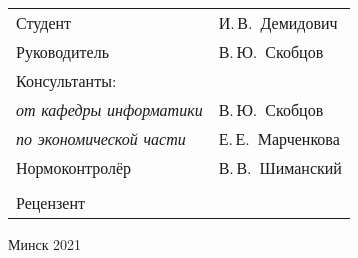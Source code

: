 \begin{titlepage}
\begin{center}
    \begin{tabular}{ p{}p{} }
      Студент & И.\,В.~Демидович \\
      Руководитель & В.\,Ю.~Скобцов \\
      Консультанты: &\\
      \hspace*{3ex}\emph{от кафедры информатики} & В.\,Ю.~Скобцов \\
      \hspace*{3ex}\emph{по экономической части} & Е.\,Е.~Марченкова \\
      Нормоконтролёр & В.\,В.~Шиманский\\
      & \\
      Рецензент &
    \end{tabular}
    
    \vfill
    {\normalsize Минск 2021}
  \end{center}
\end{titlepage}
